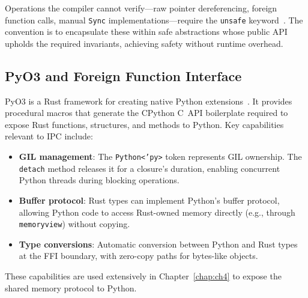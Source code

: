 Operations the compiler cannot verify---raw pointer dereferencing, foreign function calls, manual \texttt{Sync} implementations---require the \texttt{unsafe} keyword~\cite{rustonomicon}. The convention is to encapsulate these within safe abstractions whose public API upholds the required invariants, achieving safety without runtime overhead.

\subsection{PyO3 and Foreign Function Interface}

PyO3 is a Rust framework for creating native Python extensions~\cite{pyo3}. It provides procedural macros that generate the CPython C~API boilerplate required to expose Rust functions, structures, and methods to Python. Key capabilities relevant to IPC include:

\begin{itemize}
    \item \textbf{GIL management}: The \texttt{Python<'py>} token represents GIL ownership. The \texttt{detach} method releases it for a closure's duration, enabling concurrent Python threads during blocking operations.

    \item \textbf{Buffer protocol}: Rust types can implement Python's buffer protocol, allowing Python code to access Rust-owned memory directly (e.g., through \texttt{memory\-view}) without copying.

    \item \textbf{Type conversions}: Automatic conversion between Python and Rust types at the FFI boundary, with zero-copy paths for bytes-like objects.
\end{itemize}

These capabilities are used extensively in Chapter~\ref{chap:ch4} to expose the shared memory protocol to Python.
